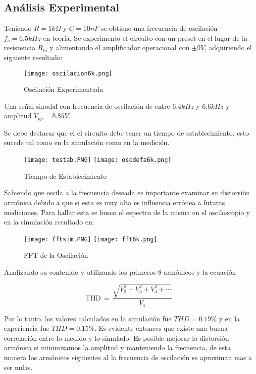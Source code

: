 \subsection{Análisis Experimental}

Teniendo $R = 1k\Omega$ y $C = 10nF$ se obtiene una frecuencia de oscilación $f_o =6.5kHz $ en teoría. Se experimento el circuito con un preset en el lugar de la resistencia $R_\mathrm{fb}$ y alimentando el amplificador operacional con $\pm 9V$, adquiriendo el siguiente resultado:

\begin{figure}[H]
    \centering
    \texttt{[image: oscilacion6k.png]}
    \caption{Oscilación Experimentada}
    \label{ej2osc}
\end{figure}

Una señal sinodal con frecuencia de oscilación de entre $6.4kHz$ y $6.6kHz$ y amplitud $V_{pp} = 8.85V$.

Se debe destacar que el el circuito debe tener un tiempo de establecimiento, esto sucede tal como en la simulación como en la medición.

\begin{figure}[H]
    \centering
    \texttt{[image: testab.PNG]}
    \texttt{[image: oscdefa6k.png]}
    \caption{Tiempo de Establecimiento}
    \label{ej2tes}
\end{figure}

Sabiendo que oscila a la frecuencia deseada es importante examinar su distorsión armónica debido a que si esta es muy alta es influencia errónea a futuras mediciones. Para hallar esta se busco el espectro de la misma en el osciloscopio y en la simulación resultado en:

\begin{figure}[H]
    \centering
    \texttt{[image: fftsim.PNG]}
    \texttt{[image: fft6k.png]}
    \caption{FFT de la Oscilación}
    \label{ej2fft}
\end{figure}

Analizando su contenido y utilizando los primeros 8 armónicos y la ecuación

$$\mathrm{THD} \,= \,\frac{ \sqrt{V_2^2 + V_3^2 + V_4^2 + \cdots} }{V_1}$$

Por lo tanto, los valores calculados en la simulación fue $THD = 0.19\%$ y en la experiencia fue $THD = 0.15\%$. Es evidente entonces que existe una buena correlación entre lo medido y lo simulado. Es posible mejorar la distorsión armónica si minimizamos la amplitud y manteniendo la frecuencia, de esta manera los armónicos siguientes al la frecuencia de oscilación se aproximan mas a ser nulas. 

